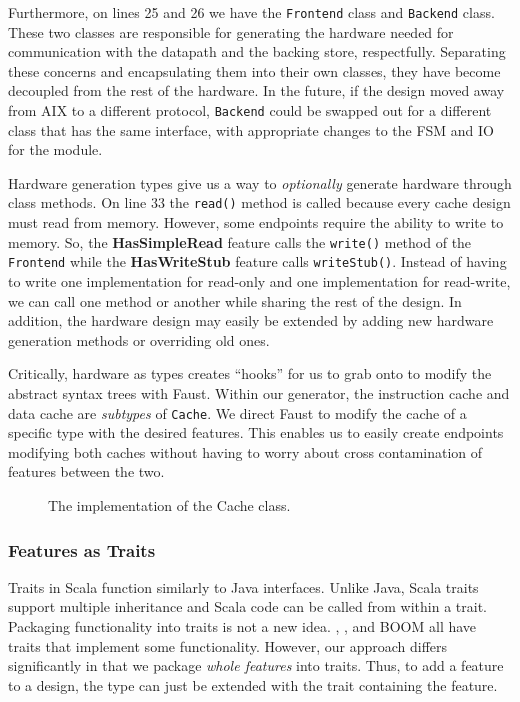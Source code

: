 \documentclass[conference]{IEEEtran}
\begin{document}
Furthermore, on lines 25 and 26 we have the \texttt{Frontend} class and \texttt{Backend} class. These two classes are responsible for generating the hardware needed for communication with the datapath and the backing store, respectfully. Separating these concerns and encapsulating them into their own classes, they have become decoupled from the rest of the hardware. In the future, if the design moved away from AIX to a different protocol, \texttt{Backend} could be swapped out for a different class that has the same interface, with appropriate changes to the FSM and IO for the module.

Hardware generation types give us a way to \emph{optionally} generate hardware through class methods. On line 33 the \texttt{read()} method is called because every cache design must read from memory. However, some endpoints require the ability to write to memory. So, the \textbf{HasSimpleRead} feature calls the \texttt{write()} method of the \texttt{Frontend} while the \textbf{HasWriteStub} feature calls \texttt{writeStub()}. Instead of having to write one implementation for read-only and one implementation for read-write, we can call one method or another while sharing the rest of the design. In addition, the hardware design may easily be extended by adding new hardware generation methods or overriding old ones.

Critically, hardware as types creates ``hooks'' for us to grab onto to modify the abstract syntax trees with Faust. Within our generator, the instruction cache and data cache are \emph{subtypes} of \texttt{Cache}. We direct Faust to modify the cache of a specific type with the desired features. This enables us to easily create endpoints modifying both caches without having to worry about cross contamination of features between the two.
\begin{figure}[ht]
    \centering
    
    \caption{The implementation of the Cache class.}
    \label{lst:BaseSystem}
\end{figure}

\subsubsection{Features as Traits}
Traits in Scala function similarly to Java interfaces. Unlike Java, Scala traits support multiple inheritance and Scala code can be called from within a trait. Packaging functionality into traits is not a new idea. \Riscvmini{}, \Rocketchip{}, and BOOM all have traits that implement some functionality. However, our approach differs significantly in that we package \emph{whole features} into traits. Thus, to add a feature to a design, the type can just be extended with the trait containing the feature.
\end{document}
